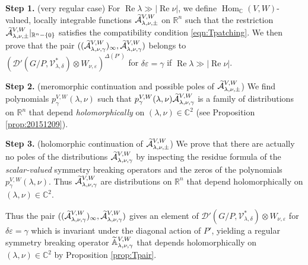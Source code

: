 \vskip 0.8pc
\par\noindent
{\bf{Step 1.}}\enspace
(very regular case)
\enspace
For $\operatorname{Re} \lambda \gg |\operatorname{Re} \nu|$, 
 we define ${\operatorname{Hom}}_{\mathbb{C}}(V,W)$-valued,
 locally integrable functions
 $\widetilde{{\mathcal{A}}}_{{\lambda},{\nu},{\pm}}^{{V,W}}$ on ${\mathbb{R}}^n$
 such that the restriction $\widetilde{{\mathcal{A}}}_{{\lambda},{\nu},{\pm}}^{{V,W}}|_{\mathbb{R}^n - \{0\}}$
 satisfies the compatibility condition \eqref{eqn:Tpatching}.  
We then prove that the pair
$
((\widetilde{{\mathcal{A}}}_{{\lambda},{\nu},{\gamma}}^{{V,W}})_{\infty}, 
  \widetilde{{\mathcal{A}}}_{{\lambda},{\nu},{\gamma}}^{{V,W}})
$
 belongs to 
$
   ({\mathcal{D}}'(G/P, {\mathcal{V}}_{\lambda,\delta}^{\ast}) \otimes W_{\nu,\varepsilon})^{\Delta(P')}
$
 for $\delta \varepsilon = \gamma$
 if ${\operatorname{Re}} \lambda \gg |{\operatorname{Re}} \nu|$.  



\vskip 0.8pc
\par\noindent
{\bf{Step 2.}}\enspace
(meromorphic continuation and possible poles of $\widetilde{{\mathcal{A}}}_{{\lambda},{\nu},{\pm}}^{{V,W}}$)\enspace
We find polynomials $p_{\gamma}^{V,W}(\lambda,\nu)$
 such that $p_{\gamma}^{V,W}(\lambda,\nu) \widetilde{{\mathcal{A}}}_{{\lambda},{\nu},{\gamma}}^{{V,W}}$
 is a family of distributions on ${\mathbb{R}}^n$
 that depend {\it{holomorphically}} on $(\lambda, \nu) \in {\mathbb{C}}^2$
 (see Proposition \ref{prop:20151209}).  



\vskip 0.8pc
\par\noindent
{\bf{Step 3.}}\enspace
(holomorphic continuation of $\widetilde{{\mathcal{A}}}_{{\lambda},{\nu},{\pm}}^{{V,W}}$)\enspace
We prove that there are actually no poles
 of the distributions $\widetilde{{\mathcal{A}}}_{{\lambda},{\nu},{\gamma}}^{{V,W}}$
 by inspecting the residue formula
 of the {\it{scalar-valued}} symmetry breaking operators
 and the zeros
 of the polynomials $p_{\gamma}^{V,W}(\lambda,\nu)$.  
Thus $\widetilde{{\mathcal{A}}}_{{\lambda},{\nu},{\gamma}}^{{V,W}}$ are
 distributions on ${\mathbb{R}}^n$
 that depend holomorphically on $(\lambda,\nu) \in {\mathbb{C}}^2$.  



Thus the pair $((\widetilde{{\mathcal{A}}}_{{\lambda},{\nu},{\gamma}}^{{V,W}})_{\infty}, \widetilde{{\mathcal{A}}}_{{\lambda},{\nu},{\gamma}}^{{V,W}})$
 gives an element
 of ${\mathcal{D}}'(G/P, {\mathcal{V}}_{\lambda,\delta}^{\ast}) \otimes W_{\nu,\varepsilon}$
 for $\delta \varepsilon =\gamma$
 which is invariant under the diagonal action of $P'$, 
 yielding a regular symmetry breaking operator ${\widetilde{\mathbb{A}}}_{{\lambda},{\nu},{\gamma}}^{{V,W}}$
 that depends holomorphically on $(\lambda,\nu) \in {\mathbb{C}}^2$
 by Proposition \ref{prop:Tpair}.  


